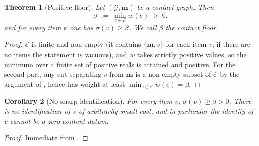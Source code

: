 \documentclass[11pt,twocolumn,a4paper]{article}
\newtheorem{theorem}{Theorem}[section]
\newtheorem{corollary}[theorem]{Corollary}
\theoremstyle{definition}
\theoremstyle{remark}
\newcommand{\Gph}{\mathcal{G}}
\newcommand{\E}{\mathcal{E}}
\newcommand{\med}{\mathbf{m}}
\newcommand{\wt}{w}
\newcommand{\flo}{\beta}
\newcommand{\sep}{\sigma}
\begin{document}
\begin{theorem}[Positive floor]
\label{thm:floor}
Let $(\Gph,\med)$ be a contact graph. Then
\[
  \flo \;:=\; \min_{e\in\E}\wt(e) \;>\; 0,
\]
and for every item $v$ one has $\sep(v)\ge\flo$. We call $\flo$ the
\emph{contact floor}.
\end{theorem}

\begin{proof}
$\E$ is finite and non-empty (it contains $\{\med,v\}$ for each item $v$;
if there are no items the statement is vacuous), and $\wt$ takes strictly
positive values, so the minimum over a finite set of positive reals is
attained and positive. For the second part, any cut separating $v$ from
$\med$ is a non-empty subset of $\E$ by the argument of
, hence has weight at least $\min_{e\in\E}\wt(e)=
\flo$.
\end{proof}

\begin{corollary}[No sharp identification]
\label{cor:nosharp}
For every item $v$, $\sep(v)\ge\flo>0$. There is no identification of $v$
of arbitrarily small cost, and in particular the identity of $v$ cannot be
a zero-content datum.
\end{corollary}

\begin{proof}
Immediate from .
\end{proof}
\end{document}
